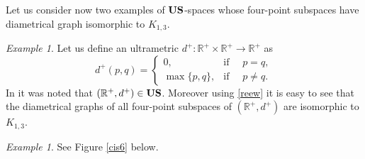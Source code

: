 \documentclass[11pt]{article}
\theoremstyle{definition}
\theoremstyle{remark}
\newtheorem{example}[theorem]{Example}
\numberwithin{equation}{section}
\begin{document}
Let us consider now two examples of ${\bf US}$-spaces whose four-point subspaces have diametrical graph isomorphic to $K_{1,3}$.




\begin{example}
 \label{fgjkdfb}
Let us define an ultrametric $d^+\colon \mathbb{R}^+ \times \mathbb{R}^+ \to \mathbb{R}^+$ as
\begin{equation}\label{reew}
d^+(p, q) =
\begin{cases}
0, & \text{if } \quad p = q, \\
\max \{p, q\}, & \text{if }\quad  p \neq q.
\end{cases}
\end{equation}
In \cite{DR2025USGbLSG} it was noted that $({\mathbb R}^+,d^+)\in {\bf US}$. Moreover using \eqref{reew} it is easy to see that the diametrical graphs of all four-point subspaces of $(\mathbb R^+,d^+)$ are isomorphic to $K_{1,3}.$

\end{example}




\begin{example}
    See Figure \ref{cis6} below.
\end{example}
\end{document}
